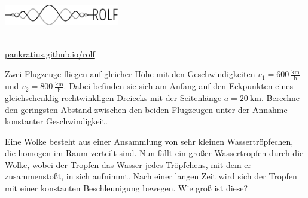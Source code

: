 \documentclass[a4paper]{article}
\begin{document}
	\vspace*{-1cm}
	\parbox{4cm}{\vspace{-0.2cm}\includegraphics[width=5cm]{../images/logo_scaled.pdf}}
	\parbox{12.5cm}{ \\
			\url{pankratius.github.io/rolf} \\ \vspace*{-.5cm} }
		\vspace{0.5cm}

\thispagestyle{empty}

\noindent














\begin{Exercise}[title = Flugzeuge, origin = Jaan Kalda]
	Zwei Flugzeuge fliegen auf gleicher Höhe mit den Geschwindigkeiten $v_1 = 600~\mathrm{\frac{km}{h}}$ und $v_2 = 800~\mathrm{\frac{km}{h}}$. Dabei befinden sie sich am Anfang auf den Eckpunkten eines gleichschenklig-rechtwinkligen Dreiecks mit der Seitenlänge $a = 20~\mathrm{km}$. Berechne den geringsten Abstand zwischen den beiden Flugzeugen unter der Annahme konstanter Geschwindigkeit.
\end{Exercise}

\begin{Exercise}[title = Wassertropfen, origin = Lukas Rettenmeier]
	Eine Wolke besteht aus einer Ansammlung von sehr kleinen Wassertröpfechen, die homogen im Raum verteilt sind. Nun fällt ein großer Wassertropfen durch die Wolke, wobei der Tropfen das Wasser jedes Tröpfchens, mit dem er zusammenstoßt, in sich aufnimmt. Nach einer langen Zeit wird sich der Tropfen mit einer konstanten Beschleunigung bewegen. Wie groß ist diese?
\end{Exercise}
\end{document}
